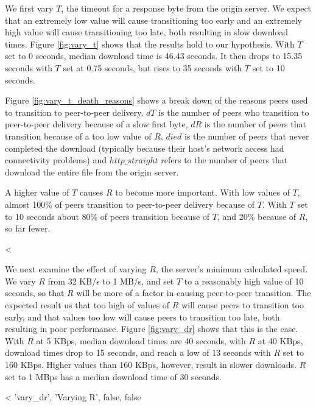 We first vary $T$, the timeout for a response byte from the origin server. We expect that an extremely low value 
will cause transitioning too early and an extremely high value 
will cause transitioning too late, both resulting in slow download times. Figure \ref{fig:vary_t} shows that 
the results hold to our hypothesis. With $T$ set to 0 seconds, median download time is 46.43 seconds. It then drops to 15.35 seconds with $T$ set at 0.75 seconds, 
but rises to 35 seconds with $T$ set to 10 seconds.

Figure \ref{fig:vary_t_death_reasons} shows a break down of the reasons peers used to transition to peer-to-peer delivery.  $dT$ is the number
of peers who transition to peer-to-peer delivery because of a slow first byte, $dR$ is the number of
peers that transition because of a too low value of $R$, $died$ is the number of peers that never completed the download
(typically because their host's network access had connectivity problems) and $http\_straight$ refers to the number of peers
that download the entire file from the origin server.

A higher value of $T$ causes $R$ to become more important.  With low values of $T$, almost 100\% of peers transition to peer-to-peer delivery because of $T$. 
With $T$ set to 10 seconds about 80\% of peers transition because of $T$, and 20\% because of $R$, so far fewer.

<%

We next examine the effect of varying $R$, the server's minimum calculated speed.  We vary $R$ from 32 KB/s to 1 MB/s, and set $T$ to a 
reasonably high value of 10 seconds, so that $R$ will be more of a factor in causing peer-to-peer transition. 
The expected result us that too high of values of $R$ will cause peers to transition 
too early, and that values too low will cause peers to transition too late, both resulting in poor performance. Figure \ref{fig:vary_dr} shows that this is the case.
With $R$ at 5 KBps, median download times are 40 seconds, with $R$ at 40 KBps, download times drop to 15 seconds, and reach
a low of 13 seconds with $R$ set to 160 KBps. Higher values than 160 KBps, however, result in slower downloads.  $R$ set to 1 MBps has a median download time of 30 seconds. 

<%
  'vary_dr', 'Varying R', false, false %

